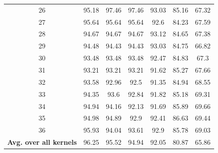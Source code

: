 \documentclass[review]{elsarticle}
\begin{document}
\begin{longtable}{c|cccccc}
	26&95.18&97.46&97.46&93.03&85.16&67.32\\
	27&95.64&95.64&95.64&92.6&84.23&67.59\\
	28&94.67&94.67&94.67&93.12&84.65&67.38\\
	29&94.48&94.43&94.43&93.03&84.75&66.82\\
	30&93.48&93.48&93.48&92.47&84.83&67.3\\
	31&93.21&93.21&93.21&91.62&85.27&67.66\\
	32&93.58&92.96&92.5&91.35&84.94&68.55\\
	33&94.35&93.6&92.84&91.82&85.18&69.31\\
	34&94.94&94.16&92.13&91.69&85.89&69.66\\
	35&94.98&94.89&92.9&92.41&86.63&69.44\\
	36&95.93&94.04&93.61&92.9&85.78&69.03\\
	\hline
	\textbf{Avg. over all kernels}&96.25&95.52&94.94&92.05&80.87&65.86\\
	\hline\hline	
\end{longtable}
\end{document}
